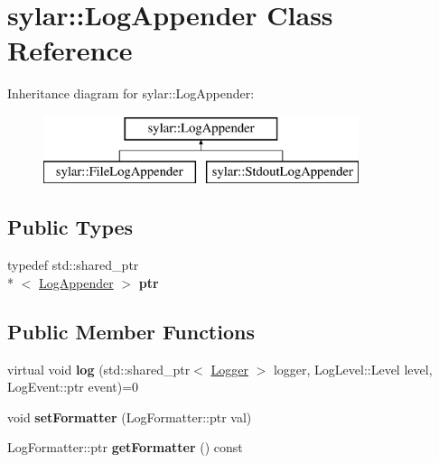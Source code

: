 \hypertarget{classsylar_1_1LogAppender}{\section{sylar\-:\-:Log\-Appender Class Reference}
\label{classsylar_1_1LogAppender}
}
Inheritance diagram for sylar\-:\-:Log\-Appender\-:\begin{figure}[H]
\begin{center}
\leavevmode
\includegraphics[height=2.000000cm]{classsylar_1_1LogAppender}
\end{center}
\end{figure}
\subsection*{Public Types}
\begin{DoxyCompactItemize}
\item 
\hypertarget{classsylar_1_1LogAppender_a16c4d71a72684533056b6b99feec1ed7}{typedef std\-::shared\-\_\-ptr\\*
$<$ \hyperlink{classsylar_1_1LogAppender}{Log\-Appender} $>$ {\bfseries ptr}}\label{classsylar_1_1LogAppender_a16c4d71a72684533056b6b99feec1ed7}

\end{DoxyCompactItemize}
\subsection*{Public Member Functions}
\begin{DoxyCompactItemize}
\item 
\hypertarget{classsylar_1_1LogAppender_ad49c2fa9abee897253b493323c47fcdd}{virtual void {\bfseries log} (std\-::shared\-\_\-ptr$<$ \hyperlink{classsylar_1_1Logger}{Logger} $>$ logger, Log\-Level\-::\-Level level, Log\-Event\-::ptr event)=0}\label{classsylar_1_1LogAppender_ad49c2fa9abee897253b493323c47fcdd}

\item 
\hypertarget{classsylar_1_1LogAppender_ade49666352b105396992ddd7099cabb9}{void {\bfseries set\-Formatter} (Log\-Formatter\-::ptr val)}\label{classsylar_1_1LogAppender_ade49666352b105396992ddd7099cabb9}

\item 
\hypertarget{classsylar_1_1LogAppender_a0ddfc4fe764328bf9d6bd9692910201f}{Log\-Formatter\-::ptr {\bfseries get\-Formatter} () const }\label{classsylar_1_1LogAppender_a0ddfc4fe764328bf9d6bd9692910201f}

\end{DoxyCompactItemize}
